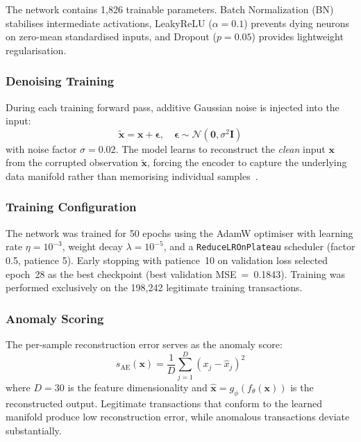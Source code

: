 \documentclass[conference,10pt]{IEEEtran}
\begin{document}
\smallskip
\noindent
The network contains 1,826 trainable parameters.  Batch Normalization (BN)
stabilises intermediate activations, LeakyReLU ($\alpha = 0.1$) prevents dying
neurons on zero-mean standardised inputs, and Dropout ($p = 0.05$) provides
lightweight regularisation.

\subsubsection{Denoising Training}
During each training forward pass, additive Gaussian noise is injected into the
input:
\begin{equation}
\tilde{\mathbf{x}} = \mathbf{x} + \boldsymbol{\epsilon}, \quad
\boldsymbol{\epsilon} \sim \mathcal{N}(\mathbf{0}, \sigma^2 \mathbf{I})
\label{eq:noise}
\end{equation}
with noise factor $\sigma = 0.02$.  The model learns to reconstruct the
\emph{clean} input $\mathbf{x}$ from the corrupted observation
$\tilde{\mathbf{x}}$, forcing the encoder to capture the underlying data
manifold rather than memorising individual samples~\cite{vincent2010}.

\subsubsection{Training Configuration}
The network was trained for 50 epochs using the AdamW optimiser with learning
rate $\eta = 10^{-3}$, weight decay $\lambda = 10^{-5}$, and a
\texttt{ReduceLROnPlateau} scheduler (factor 0.5, patience 5).  Early stopping
with patience~10 on validation loss selected epoch~28 as the best checkpoint
(best validation MSE~=~0.1843).  Training was performed exclusively on the
198,242 legitimate training transactions.

\subsubsection{Anomaly Scoring}
The per-sample reconstruction error serves as the anomaly score:
\begin{equation}
s_{\text{AE}}(\mathbf{x}) = \frac{1}{D} \sum_{j=1}^{D}
    \left(x_j - \hat{x}_j\right)^2
\label{eq:recon}
\end{equation}
where $D = 30$ is the feature dimensionality and $\hat{\mathbf{x}} =
g_\phi(f_\theta(\mathbf{x}))$ is the reconstructed output.  Legitimate
transactions that conform to the learned manifold produce low reconstruction
error, while anomalous transactions deviate substantially.
\end{document}
